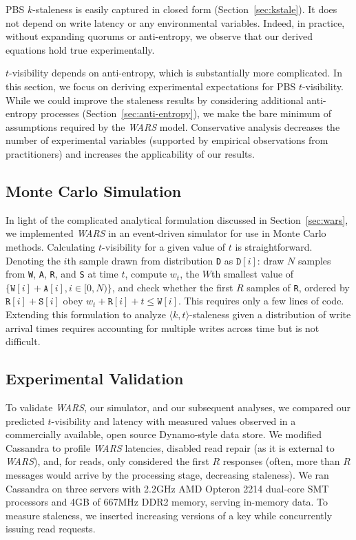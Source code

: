 \documentclass{vldb}
\newcommand{\subsectionskip}{-0em}
\begin{document}
PBS $k$-staleness is easily captured in closed form
(Section~\ref{sec:kstale}).  It does not depend on write latency or
any environmental variables.  Indeed, in practice, without expanding
quorums or anti-entropy, we observe that our derived equations hold
true experimentally.

$t$-visibility depends on anti-entropy, which is substantially more
complicated.  In this section, we focus on deriving experimental
expectations for PBS $t$-visibility.  While we could improve the
staleness results by considering additional anti-entropy processes
(Section~\ref{sec:anti-entropy}), we make the bare minimum of
assumptions required by the \textit{WARS} model.  Conservative
analysis decreases the number of experimental variables (supported by
empirical observations from practitioners) and increases the
applicability of our results.

\vspace{\subsectionskip}\subsection{Monte Carlo Simulation}
\label{sec:mcsim}

In light of the complicated analytical formulation discussed in
Section~\ref{sec:wars}, we implemented \textit{WARS} in an
event-driven simulator for use in Monte Carlo methods.  Calculating
$t$-visibility for a given value of $t$ is straightforward. Denoting the
$i$th sample drawn from distribution \texttt{D} as $\texttt{D}[i]$:
draw $N$ samples from \texttt{W}, \texttt{A}, \texttt{R}, and
\texttt{S} at time $t$, compute $w_t$, the $W$th smallest value of $\{\texttt{W}[i]+\texttt{A}[i], i \in [0, N)\}$, and check whether the first
$R$ samples of \texttt{R}, ordered by $\texttt{R}[i]+\texttt{S}[i]$
obey $w_t+\texttt{R}[i] + t\leq \texttt{W}[i]$.  This requires only a
few lines of code.  Extending this formulation to analyze $\langle k,
t \rangle$-staleness given a distribution of write arrival times
requires accounting for multiple writes across time but is not
difficult.

\subsection{Experimental Validation}

To validate \textit{WARS}, our simulator, and our subsequent analyses,
we compared our predicted $t$-visibility and latency with measured
values observed in a commercially available, open source Dynamo-style
data store.  We modified Cassandra to profile \textit{WARS} latencies,
disabled read repair (as it is external to \textit{WARS}), and, for
reads, only considered the first $R$ responses (often, more than $R$
messages would arrive by the processing stage, decreasing staleness).
We ran Cassandra on three servers with 2.2GHz AMD Opteron 2214
dual-core SMT processors and 4GB of 667MHz DDR2 memory, serving
in-memory data.  To measure staleness, we inserted increasing versions of a key while concurrently issuing read requests.
\end{document}

